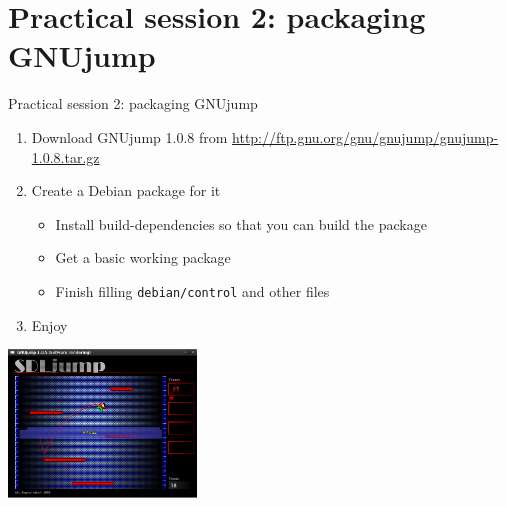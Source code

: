 \documentclass[10pt,final]{beamer}
\begin{document}
\section{Practical session 2: packaging GNUjump}
\begin{frame}{Practical session 2: packaging GNUjump}
\begin{enumerate}
	\item Download GNUjump 1.0.8 from
		\url{http://ftp.gnu.org/gnu/gnujump/gnujump-1.0.8.tar.gz}
		\br
	\item Create a Debian package for it
		\begin{itemize}
			\item Install build-dependencies so that you can build the package
			\item Get a basic working package
			\item Finish filling \texttt{debian/control} and other files
		\end{itemize}
		\br
	\item Enjoy
\end{enumerate}
\centerline{\includegraphics[width=5cm]{figs/gnujump.png}}
\end{frame}
\end{document}
